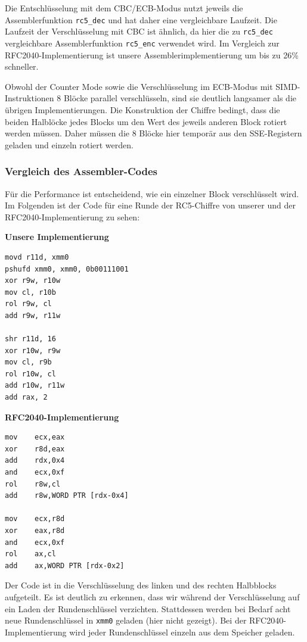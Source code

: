 \documentclass[course=erap]{aspdoc}
\begin{document}
Die Entschlüsselung mit dem CBC/ECB-Modus nutzt jeweils die Assemblerfunktion \texttt{rc5\_dec} und hat daher eine vergleichbare Laufzeit. Die Laufzeit der Verschlüsselung mit CBC ist ähnlich, da hier die zu \texttt{rc5\_dec} vergleichbare Assemblerfunktion \texttt{rc5\_enc} verwendet wird. Im Vergleich zur RFC2040-Implementierung
ist unsere Assemblerimplementierung um bis zu 26\% schneller.\bigbreak

Obwohl der Counter Mode sowie die Verschlüsselung im ECB-Modus mit SIMD-Instruktionen 8 Blöcke parallel verschlüsseln, sind sie deutlich langsamer als die übrigen Implementierungen. Die Konstruktion der Chiffre bedingt, dass die beiden Halblöcke jedes Blocks um den Wert des jeweils anderen Block rotiert werden müssen. Daher müssen die 8 Blöcke hier temporär aus den SSE-Registern geladen und einzeln rotiert werden.

\subsubsection{Vergleich des Assembler-Codes}

Für die Performance ist entscheidend, wie ein einzelner Block verschlüsselt wird. Im Folgenden ist der Code für eine Runde der RC5-Chiffre von unserer und der RFC2040-Implementierung zu sehen:

\begin{multicols}{2}

\noindent \textbf{Unsere Implementierung}

\begin{verbatim}
movd r11d, xmm0
pshufd xmm0, xmm0, 0b00111001
xor r9w, r10w
mov cl, r10b
rol r9w, cl
add r9w, r11w

shr r11d, 16
xor r10w, r9w
mov cl, r9b
rol r10w, cl
add r10w, r11w
add rax, 2
\end{verbatim}

\noindent \textbf{RFC2040-Implementierung}

\begin{verbatim}
mov    ecx,eax
xor    r8d,eax
add    rdx,0x4
and    ecx,0xf
rol    r8w,cl
add    r8w,WORD PTR [rdx-0x4]

mov    ecx,r8d
xor    eax,r8d
and    ecx,0xf
rol    ax,cl
add    ax,WORD PTR [rdx-0x2]

\end{verbatim}

\end{multicols}

\noindent Der Code ist in die Verschlüsselung des linken und des rechten Halbblocks aufgeteilt. Es ist deutlich zu erkennen, dass wir während der Verschlüsselung auf ein Laden der Rundenschlüssel verzichten. Stattdessen werden bei Bedarf acht neue Rundenschlüssel in \texttt{xmm0} geladen (hier nicht gezeigt). Bei der RFC2040-Implementierung wird jeder Rundenschlüssel einzeln aus dem Speicher geladen.
\end{document}
